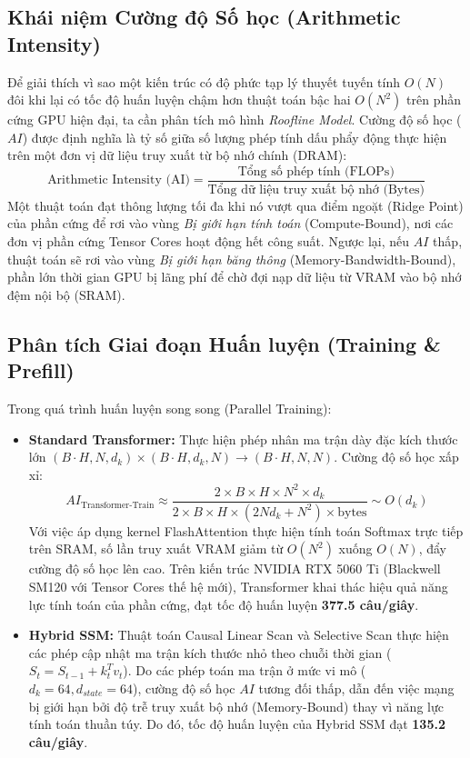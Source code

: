 \documentclass{uetgraduation}
\begin{document}
\subsection{Khái niệm Cường độ Số học (Arithmetic Intensity)}
Để giải thích vì sao một kiến trúc có độ phức tạp lý thuyết tuyến tính $O(N)$ đôi khi lại có tốc độ huấn luyện chậm hơn thuật toán bậc hai $O(N^2)$ trên phần cứng GPU hiện đại, ta cần phân tích mô hình \textit{Roofline Model}. Cường độ số học ($AI$) được định nghĩa là tỷ số giữa số lượng phép tính dấu phẩy động thực hiện trên một đơn vị dữ liệu truy xuất từ bộ nhớ chính (DRAM):
\begin{equation}
\text{Arithmetic Intensity (AI)} = \frac{\text{Tổng số phép tính (FLOPs)}}{\text{Tổng dữ liệu truy xuất bộ nhớ (Bytes)}}
\end{equation}
Một thuật toán đạt thông lượng tối đa khi nó vượt qua điểm ngoặt (Ridge Point) của phần cứng để rơi vào vùng \textit{Bị giới hạn tính toán} (Compute-Bound), nơi các đơn vị phần cứng Tensor Cores hoạt động hết công suất. Ngược lại, nếu $AI$ thấp, thuật toán sẽ rơi vào vùng \textit{Bị giới hạn băng thông} (Memory-Bandwidth-Bound), phần lớn thời gian GPU bị lãng phí để chờ đợi nạp dữ liệu từ VRAM vào bộ nhớ đệm nội bộ (SRAM).

\subsection{Phân tích Giai đoạn Huấn luyện (Training \& Prefill)}
Trong quá trình huấn luyện song song (Parallel Training):
\begin{itemize}
    \item \textbf{Standard Transformer:} Thực hiện phép nhân ma trận dày đặc kích thước lớn $(B \cdot H, N, d_k) \times (B \cdot H, d_k, N) \to (B \cdot H, N, N)$. Cường độ số học xấp xỉ:
    \begin{equation}
    AI_{\text{Transformer-Train}} \approx \frac{2 \times B \times H \times N^2 \times d_k}{2 \times B \times H \times (2 N d_k + N^2) \times \text{bytes}} \sim O(d_k)
    \end{equation}
    Với việc áp dụng kernel FlashAttention thực hiện tính toán Softmax trực tiếp trên SRAM, số lần truy xuất VRAM giảm từ $O(N^2)$ xuống $O(N)$, đẩy cường độ số học lên cao. Trên kiến trúc NVIDIA RTX 5060 Ti (Blackwell SM120 với Tensor Cores thế hệ mới), Transformer khai thác hiệu quả năng lực tính toán của phần cứng, đạt tốc độ huấn luyện \textbf{377.5 câu/giây}.
    \item \textbf{Hybrid SSM:} Thuật toán Causal Linear Scan và Selective Scan thực hiện các phép cập nhật ma trận kích thước nhỏ theo chuỗi thời gian ($S_t = S_{t-1} + k_t^T v_t$). Do các phép toán ma trận ở mức vi mô ($d_k=64, d_{state}=64$), cường độ số học $AI$ tương đối thấp, dẫn đến việc mạng bị giới hạn bởi độ trễ truy xuất bộ nhớ (Memory-Bound) thay vì năng lực tính toán thuần túy. Do đó, tốc độ huấn luyện của Hybrid SSM đạt \textbf{135.2 câu/giây}.
\end{itemize}
\end{document}
